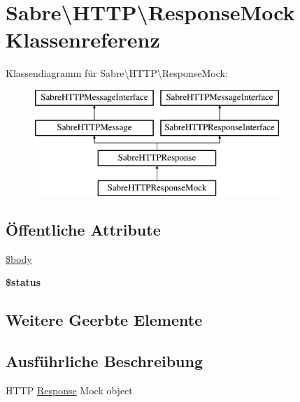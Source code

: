 \hypertarget{class_sabre_1_1_h_t_t_p_1_1_response_mock}{}\section{Sabre\textbackslash{}H\+T\+TP\textbackslash{}Response\+Mock Klassenreferenz}
\label{class_sabre_1_1_h_t_t_p_1_1_response_mock}
Klassendiagramm für Sabre\textbackslash{}H\+T\+TP\textbackslash{}Response\+Mock\+:\begin{figure}[H]
\begin{center}
\leavevmode
\includegraphics[height=4.000000cm]{class_sabre_1_1_h_t_t_p_1_1_response_mock}
\end{center}
\end{figure}
\subsection*{Öffentliche Attribute}
\begin{DoxyCompactItemize}
\item 
\mbox{\hyperlink{class_sabre_1_1_h_t_t_p_1_1_response_mock_a931895a1b5cea51f38ea39127781f621}{\$body}}
\item 
\mbox{\label{class_sabre_1_1_h_t_t_p_1_1_response_mock_ad8b313151cfd1a09efffcfd1e1f306e2}} 
{\bfseries \$status}
\end{DoxyCompactItemize}
\subsection*{Weitere Geerbte Elemente}


\subsection{Ausführliche Beschreibung}
H\+T\+TP \mbox{\hyperlink{class_sabre_1_1_h_t_t_p_1_1_response}{Response}} Mock object

